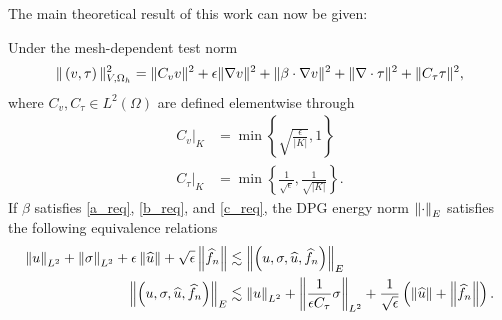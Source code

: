 The main theoretical result of this work can now be given:
\begin{lemma}
Under the mesh-dependent test norm
\[
\|\left(v,\tau\right)\|_{V,\Oh}^2 = \|C_vv\|^2 + \epsilon \|\grad v\|^2 + \|\beta \cdot \grad v\|^2 + \| \div \tau\|^2 + \|C_\tau\tau\|^2,
\]
where $C_v, C_{\tau}\in L^2(\Omega)$ are defined elementwise through
\begin{align*}
\left.C_v\right |_K &= \min\left\{\sqrt{\frac{\epsilon}{|K|}},1\right\}\\
\left.C_{\tau}\right |_K &= \min\left\{\frac{1}{\sqrt{\epsilon}},\frac{1}{\sqrt{|K|}}\right\}.
\end{align*}
If $\beta$ satisfies \eqref{a_req}, \eqref{b_req}, and \eqref{c_req}, the DPG energy norm $\nor{\cdot}_E$ satisfies the following equivalence relations
\begin{align*}
\nor{u}_{L^2} + \nor{\sigma}_{L^2} + \epsilon\nor{\widehat{u}} + \sqrt{\epsilon}\nor{\widehat{f}_n} 
&\lesssim \nor{\left(u,\sigma, \widehat{u},\widehat{f}_n\right)}_E \\ 
\nor{\left(u,\sigma, \widehat{u},\widehat{f}_n\right)}_E &\lesssim \nor{u}_{L^2} + \nor{\frac{1}{\epsilon C_\tau} \sigma}_{L^2} + \frac{1}{\sqrt{\epsilon}} \left(\nor{\widehat{u}} + \nor{\widehat{f}_n}\right).
\end{align*}
\end{lemma}

